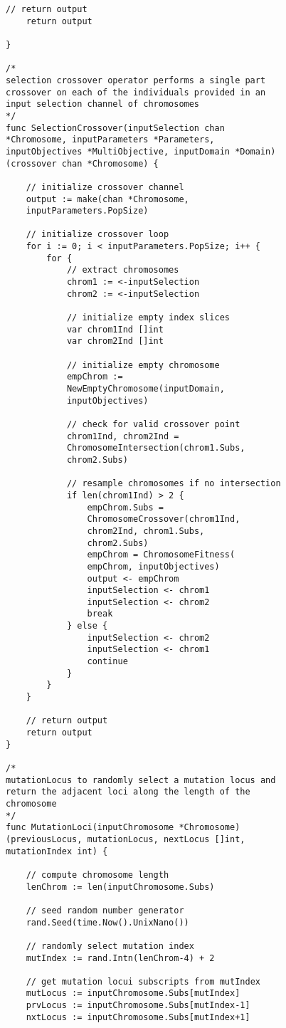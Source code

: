 \begin{lstlisting}[basicstyle=\small]
	// return output
	return output

}

/* 
selection crossover operator performs a single part
crossover on each of the individuals provided in an
input selection channel of chromosomes
*/
func SelectionCrossover(inputSelection chan 
*Chromosome, inputParameters *Parameters, 
inputObjectives *MultiObjective, inputDomain *Domain) 
(crossover chan *Chromosome) {

	// initialize crossover channel
	output := make(chan *Chromosome, 
	inputParameters.PopSize)

	// initialize crossover loop
	for i := 0; i < inputParameters.PopSize; i++ {
		for {
			// extract chromosomes
			chrom1 := <-inputSelection
			chrom2 := <-inputSelection

			// initialize empty index slices
			var chrom1Ind []int
			var chrom2Ind []int

			// initialize empty chromosome
			empChrom := 
			NewEmptyChromosome(inputDomain, 
			inputObjectives)

			// check for valid crossover point
			chrom1Ind, chrom2Ind = 
			ChromosomeIntersection(chrom1.Subs, 
			chrom2.Subs)

			// resample chromosomes if no intersection
			if len(chrom1Ind) > 2 {
				empChrom.Subs = 
				ChromosomeCrossover(chrom1Ind, 
				chrom2Ind, chrom1.Subs, 
				chrom2.Subs)
				empChrom = ChromosomeFitness(
				empChrom, inputObjectives)
				output <- empChrom
				inputSelection <- chrom1
				inputSelection <- chrom2
				break
			} else {
				inputSelection <- chrom2
				inputSelection <- chrom1
				continue
			}
		}
	}

	// return output
	return output
}

/* 
mutationLocus to randomly select a mutation locus and 
return the adjacent loci along the length of the 
chromosome
*/
func MutationLoci(inputChromosome *Chromosome) 
(previousLocus, mutationLocus, nextLocus []int, 
mutationIndex int) {

	// compute chromosome length
	lenChrom := len(inputChromosome.Subs)

	// seed random number generator
	rand.Seed(time.Now().UnixNano())

	// randomly select mutation index
	mutIndex := rand.Intn(lenChrom-4) + 2

	// get mutation locui subscripts from mutIndex
	mutLocus := inputChromosome.Subs[mutIndex]
	prvLocus := inputChromosome.Subs[mutIndex-1]
	nxtLocus := inputChromosome.Subs[mutIndex+1]


\end{lstlisting}
